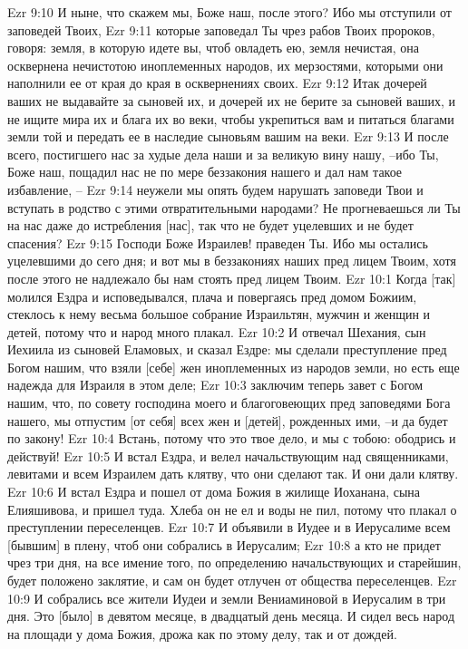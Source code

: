 Ezr 9:10  И ныне, что скажем мы, Боже наш, после этого? Ибо мы отступили от заповедей Твоих,
Ezr 9:11  которые заповедал Ты чрез рабов Твоих пророков, говоря: земля, в которую идете вы, чтоб овладеть ею, земля нечистая, она осквернена нечистотою иноплеменных народов, их мерзостями, которыми они наполнили ее от края до края в осквернениях своих.
Ezr 9:12  Итак дочерей ваших не выдавайте за сыновей их, и дочерей их не берите за сыновей ваших, и не ищите мира их и блага их во веки, чтобы укрепиться вам и питаться благами земли той и передать ее в наследие сыновьям вашим на веки.
Ezr 9:13  И после всего, постигшего нас за худые дела наши и за великую вину нашу, --ибо Ты, Боже наш, пощадил нас не по мере беззакония нашего и дал нам такое избавление, --
Ezr 9:14  неужели мы опять будем нарушать заповеди Твои и вступать в родство с этими отвратительными народами? Не прогневаешься ли Ты на нас даже до истребления [нас], так что не будет уцелевших и не будет спасения?
Ezr 9:15  Господи Боже Израилев! праведен Ты. Ибо мы остались уцелевшими до сего дня; и вот мы в беззакониях наших пред лицем Твоим, хотя после этого не надлежало бы нам стоять пред лицем Твоим.
Ezr 10:1  Когда [так] молился Ездра и исповедывался, плача и повергаясь пред домом Божиим, стеклось к нему весьма большое собрание Израильтян, мужчин и женщин и детей, потому что и народ много плакал.
Ezr 10:2  И отвечал Шехания, сын Иехиила из сыновей Еламовых, и сказал Ездре: мы сделали преступление пред Богом нашим, что взяли [себе] жен иноплеменных из народов земли, но есть еще надежда для Израиля в этом деле;
Ezr 10:3  заключим теперь завет с Богом нашим, что, по совету господина моего и благоговеющих пред заповедями Бога нашего, мы отпустим [от себя] всех жен и [детей], рожденных ими, --и да будет по закону!
Ezr 10:4  Встань, потому что это твое дело, и мы с тобою: ободрись и действуй!
Ezr 10:5  И встал Ездра, и велел начальствующим над священниками, левитами и всем Израилем дать клятву, что они сделают так. И они дали клятву.
Ezr 10:6  И встал Ездра и пошел от дома Божия в жилище Иоханана, сына Елияшивова, и пришел туда. Хлеба он не ел и воды не пил, потому что плакал о преступлении переселенцев.
Ezr 10:7  И объявили в Иудее и в Иерусалиме всем [бывшим] в плену, чтоб они собрались в Иерусалим;
Ezr 10:8  а кто не придет чрез три дня, на все имение того, по определению начальствующих и старейшин, будет положено заклятие, и сам он будет отлучен от общества переселенцев.
Ezr 10:9  И собрались все жители Иудеи и земли Вениаминовой в Иерусалим в три дня. Это [было] в девятом месяце, в двадцатый день месяца. И сидел весь народ на площади у дома Божия, дрожа как по этому делу, так и от дождей.
